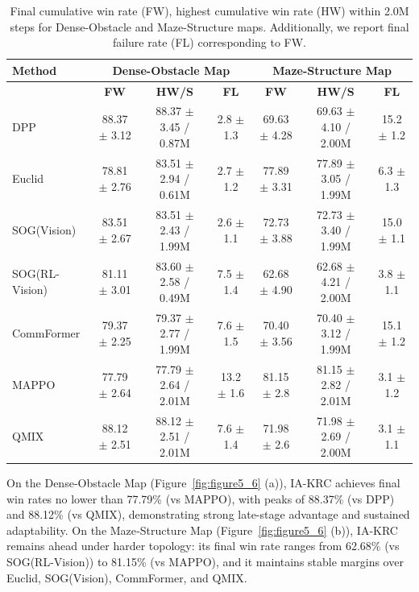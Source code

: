 \documentclass[10pt]{article} %
\begin{document}
\begingroup
\setlength{\textfloatsep}{6pt}
\setlength{\intextsep}{6pt}
\begin{table}[!htbp]
\centering
 \footnotesize
 \setlength{\tabcolsep}{6pt}
\begin{tabular*}{\textwidth}{@{\extracolsep{\fill}} l|ccc|ccc @{} }
\toprule
\textbf{Method} & \multicolumn{3}{c|}{\textbf{Dense-Obstacle Map}} & \multicolumn{3}{c}{\textbf{Maze-Structure Map}} \\
\midrule
& \textbf{FW} & \textbf{HW/S} & \textbf{FL} & \textbf{FW} & \textbf{HW/S} & \textbf{FL} \\
\midrule
 DPP        & 88.37 $\pm$ 3.12 & 88.37 $\pm$ 3.45 / 0.87M & 2.8 $\pm$ 1.3 & 69.63 $\pm$ 4.28 & 69.63 $\pm$ 4.10 / 2.00M & 15.2 $\pm$ 1.2 \\
 Euclid     & 78.81 $\pm$ 2.76 & 83.51 $\pm$ 2.94 / 0.61M & 2.7 $\pm$ 1.2 & 77.89 $\pm$ 3.31 & 77.89 $\pm$ 3.05 / 1.99M & 6.3 $\pm$ 1.3 \\
 SOG(Vision)     & 83.51 $\pm$ 2.67 & 83.51 $\pm$ 2.43 / 1.99M & 2.6 $\pm$ 1.1 & 72.73 $\pm$ 3.88 & 72.73 $\pm$ 3.40 / 1.99M & 15.0 $\pm$ 1.1 \\
 SOG(RL-Vision)  & 81.11 $\pm$ 3.01 & 83.60 $\pm$ 2.58 / 0.49M & 7.5 $\pm$ 1.4 & 62.68 $\pm$ 4.90 & 62.68 $\pm$ 4.21 / 2.00M & 3.8 $\pm$ 1.1 \\
 CommFormer & 79.37 $\pm$ 2.25 & 79.37 $\pm$ 2.77 / 1.99M & 7.6 $\pm$ 1.5 & 70.40 $\pm$ 3.56 & 70.40 $\pm$ 3.12 / 1.99M & 15.1 $\pm$ 1.2 \\
 MAPPO      & 77.79 $\pm$ 2.64 & 77.79 $\pm$ 2.64 / 2.01M & 13.2 $\pm$ 1.6 & 81.15 $\pm$ 2.8 & 81.15 $\pm$ 2.82 / 2.01M & 3.1 $\pm$ 1.2 \\
 QMIX       & 88.12 $\pm$ 2.51 & 88.12 $\pm$ 2.51 / 2.01M & 7.6 $\pm$ 1.4 & 71.98 $\pm$ 2.6 & 71.98 $\pm$ 2.69 / 2.00M & 3.1 $\pm$ 1.1 \\
 \bottomrule
\end{tabular*}
\caption{Final cumulative win rate (FW), highest cumulative win rate (HW) within 2.0M steps for Dense-Obstacle and Maze-Structure maps. Additionally, we report final failure rate (FL) corresponding to FW.}
\label{tab:fw_hw_combined}
\end{table}
\endgroup

On the Dense‑Obstacle Map (Figure~\ref{fig:figure5_6} (a)), IA-KRC achieves final win rates no lower than 77.79\% (vs MAPPO), with peaks of 88.37\% (vs DPP) and 88.12\% (vs QMIX), demonstrating strong late-stage advantage and sustained adaptability.
On the Maze‑Structure Map (Figure~\ref{fig:figure5_6} (b)), IA-KRC remains ahead under harder topology: its final win rate ranges from 62.68\% (vs SOG(RL-Vision)) to 81.15\% (vs MAPPO), and it maintains stable margins over Euclid, SOG(Vision), CommFormer, and QMIX.
\end{document}

